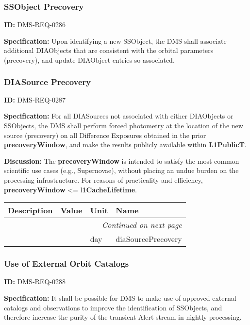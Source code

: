 \documentclass[SE,toc,lsstdraft]{lsstdoc}
\makeatletter
\newcommand{\paramname}[1]{\hspace{0pt}#1}
\newcommand{\unitname}[1]{\hspace{0pt}#1}
\newenvironment{parameters}[0]{%
\setlength\LTleft{0pt}
\setlength\LTright{\fill}
\begin{small}
\begin{longtable}[]{|p{0.5\textwidth}|l|p{0.6in}|p{1.74in}@{}|}

\hline \textbf{Description} & \textbf{Value} & \textbf{Unit} & \textbf{Name} \\ \hline
\endhead

\hline \multicolumn{4}{r}{\emph{Continued on next page}} \\
\endfoot

\hline\hline
\endlastfoot
}{%
\hline
\end{longtable}
\end{small}
}
\makeatother
\begin{document}
\subsubsection{SSObject Precovery}

\label{DMS-REQ-0286}
\textbf{ID:} DMS-REQ-0286

\textbf{Specification:} Upon identifying a new SSObject, the DMS shall associate additional DIAObjects that are consistent with the orbital parameters (precovery), and update DIAObject entries so associated.






\subsubsection{DIASource Precovery}

\label{DMS-REQ-0287}
\textbf{ID:} DMS-REQ-0287

\textbf{Specification:} For all DIASources not associated with either DIAObjects or SSObjects, the DMS shall perform forced photometry at the location of the new source (precovery) on all Difference Exposures obtained in the prior \textbf{precoveryWindow}, and make the results publicly available within \textbf{L1PublicT}.

\textbf{Discussion: }The \textbf{precoveryWindow }is intended to satisfy the most common scientific use cases (e.g., Supernovae), without placing an undue burden on the processing infrastructure.  For reasons of practicality and efficiency, \textbf{precoveryWindow }<= l\textbf{1CacheLifetime}.



\begin{parameters}

&

&
\unitname{%
day
}
&
\paramname{%
diaSourcePrecovery
} \\\hline
\end{parameters}




\subsubsection{Use of External Orbit Catalogs}

\label{DMS-REQ-0288}
\textbf{ID:} DMS-REQ-0288

\textbf{Specification:} It shall be possible for DMS to make use of approved external catalogs and observations to improve the identification of SSObjects, and therefore increase the purity of the transient Alert stream in nightly processing.
\end{document}
